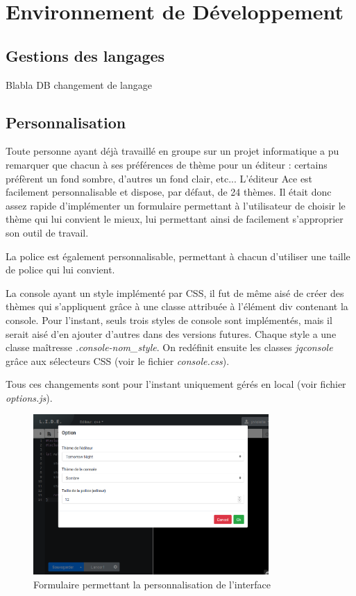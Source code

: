 \section{Environnement de Développement}

\subsection{Gestions des langages}
Blabla DB changement de langage

\subsection{Personnalisation}

Toute personne ayant déjà travaillé en groupe sur un projet informatique a pu remarquer que chacun à ses préférences de thème pour un éditeur : certains préfèrent un fond sombre, d'autres un fond clair, etc... L'éditeur Ace est facilement personnalisable et dispose, par défaut, de 24 thèmes. Il était donc assez rapide d'implémenter un formulaire permettant à l'utilisateur de choisir le thème qui lui convient le mieux, lui permettant ainsi de facilement s'approprier son outil de travail.

La police est également personnalisable, permettant à chacun d'utiliser une taille de police qui lui convient.

La console ayant un style implémenté par CSS, il fut de même aisé de créer des thèmes qui s'appliquent grâce à une classe attribuée à l'élément div contenant la console. Pour l'instant, seuls trois styles de console sont implémentés, mais il serait aisé d'en ajouter d'autres dans des versions futures. Chaque style a une classe maîtresse \emph{.console-nom\_style}. On redéfinit ensuite les classes \emph{jqconsole} grâce aux sélecteurs CSS (voir le fichier \emph{console.css}).

Tous ces changements sont pour l'instant uniquement gérés en local (voir fichier \emph{options.js}).

\begin{figure}[!h]
\centering
\includegraphics[width=0.8\textwidth]{./img/frontend/example_personnalisation.png}
\caption{Formulaire permettant la personnalisation de l'interface}
\end{figure}

